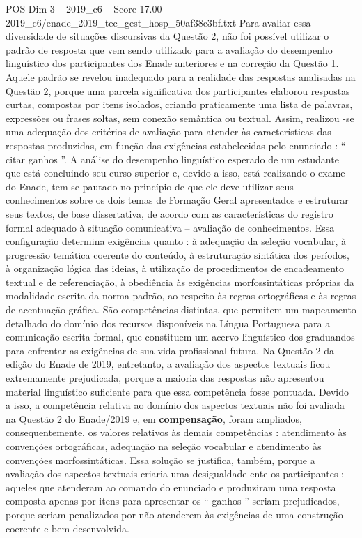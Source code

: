 \begin{textsample}{POS Dim 3 – 2019\_c6 – Score 17.00 – 2019\_c6/enade\_2019\_tec\_gest\_hosp\_50af38c3bf.txt}
Para avaliar essa diversidade de situações discursivas da Questão 2, não foi possível utilizar o padrão de resposta que vem sendo utilizado para a avaliação do desempenho linguístico dos participantes dos Enade anteriores e na correção da Questão 1.
Aquele padrão se revelou inadequado para a realidade das respostas analisadas na Questão 2, porque uma parcela significativa dos participantes elaborou respostas curtas, compostas por itens isolados, criando praticamente uma lista de palavras, expressões ou frases soltas, sem conexão semântica ou textual.
Assim, realizou -se uma adequação dos critérios de avaliação para atender às características das respostas produzidas, em função das exigências estabelecidas pelo enunciado : “ citar ganhos ”.
A análise do desempenho linguístico esperado de um estudante que está concluindo seu curso superior e, devido a isso, está realizando o exame do Enade, tem se pautado no princípio de que ele deve utilizar seus conhecimentos sobre os dois temas de Formação Geral apresentados e estruturar seus textos, de base dissertativa, de acordo com as características do registro formal adequado à situação comunicativa – avaliação de conhecimentos.
Essa configuração determina exigências quanto : à adequação da seleção vocabular, à progressão temática coerente do conteúdo, à estruturação sintática dos períodos, à organização lógica das ideias, à utilização de procedimentos de encadeamento textual e de referenciação, à obediência às exigências morfossintáticas próprias da modalidade escrita da norma-padrão, ao respeito às regras ortográficas e às regras de acentuação gráfica.
São competências distintas, que permitem um mapeamento detalhado do domínio dos recursos disponíveis na Língua Portuguesa para a comunicação escrita formal, que constituem um acervo linguístico dos graduandos para enfrentar as exigências de sua vida profissional futura.
Na Questão 2 da edição do Enade de 2019, entretanto, a avaliação dos aspectos textuais ficou extremamente prejudicada, porque a maioria das respostas não apresentou material linguístico suficiente para que essa competência fosse pontuada.
Devido a isso, a competência relativa ao domínio dos aspectos textuais não foi avaliada na Questão 2 do Enade/2019 e, em \textbf{compensação}, foram ampliados, consequentemente, os valores relativos às demais competências : atendimento às convenções ortográficas, adequação na seleção vocabular e atendimento às convenções morfossintáticas.
Essa solução se justifica, também, porque a avaliação dos aspectos textuais criaria uma desigualdade ente os participantes : aqueles que atenderam ao comando do enunciado e produziram uma resposta composta apenas por itens para apresentar os “ ganhos ” seriam prejudicados, porque seriam penalizados por não atenderem às exigências de uma construção coerente e bem desenvolvida.

\end{textsample}

